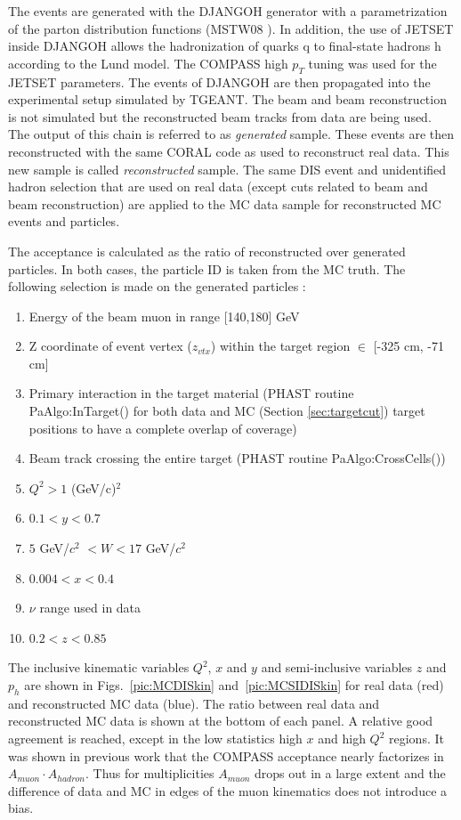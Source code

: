 The events are generated with the DJANGOH generator with a parametrization of the parton distribution functions (MSTW08 \cite{MSTW08}). In addition, the use of JETSET inside DJANGOH allows the hadronization of quarks q to final-state hadrons h according to the Lund model. The COMPASS high $p_T$ tuning was used for the JETSET parameters. The events of DJANGOH are then propagated into the experimental setup simulated by TGEANT. The beam and beam reconstruction is not simulated but the reconstructed beam tracks from data are being used. The output of this chain is referred to as \textit{generated} sample. These events are then reconstructed with the same CORAL code as used to reconstruct real data. This new sample is called \textit{reconstructed} sample. The same DIS event and unidentified hadron selection that are used on real data (except cuts related to beam and beam reconstruction) are applied to the MC data sample for reconstructed MC events and particles.

The acceptance is calculated as the ratio of reconstructed over generated particles. In both cases, the particle ID is taken from the MC truth. The following selection is made on the generated particles :

\begin{enumerate}
  \item Energy of the beam muon in range [140,180] GeV
	\item Z coordinate of event vertex ($z_{vtx}$) within the target region $\in$ [-325 cm, -71 cm]
	\item Primary interaction in the target material (PHAST routine PaAlgo:InTarget() for both data and MC (Section \ref{sec:targetcut}) target positions to have a complete overlap of coverage)
	\item Beam track crossing the entire target (PHAST routine PaAlgo:CrossCells())
  \item $Q^2>1$ (GeV/c)$^2$
  \item $0.1 < y < 0.7$
	\item $5$ GeV/$c^2$ $< W < 17$ GeV/$c^2$
  \item $0.004 < x < 0.4$
  \item $\nu$ range used in data
  \item $0.2 < z < 0.85$
\end{enumerate}

The inclusive kinematic variables $Q^2$, $x$ and $y$ and semi-inclusive variables $z$ and $p_h$ are shown in Figs.~\ref{pic:MCDISkin} and~\ref{pic:MCSIDISkin} for real data (red) and reconstructed MC data (blue). The ratio between real data and reconstructed MC data is shown at the bottom of each panel. A relative good agreement is reached, except in the low statistics high $x$ and high $Q^2$ regions. It was shown in previous work that the COMPASS acceptance nearly factorizes in $A_{muon} \cdot A_{hadron}$. Thus for multiplicities $A_{muon}$ drops out in a large extent and the difference of data and MC in edges of the muon kinematics does not introduce a bias.

